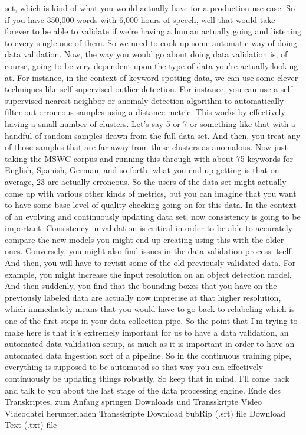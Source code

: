 {{{{    set, which is kind of what you would actually
    have for a production use case.
    So if you have 350,000 words with 6,000 hours of speech,
    well that would take forever to be able to validate
    if we're having a human actually going and listening
    to every single one of them.
    So we need to cook up some automatic way of doing data validation.
    Now, the way you would go about doing data validation
    is, of course, going to be very dependent upon the type of data
    you're actually looking at.
    For instance, in the context of keyword spotting data,
    we can use some clever techniques like self-supervised outlier detection.
    For instance, you can use a self-supervised nearest
    neighbor or anomaly detection algorithm to automatically filter out
    erroneous samples using a distance metric.
    This works by effectively having a small number of clusters.
    Let's say 5 or 7 or something like that with a handful of random samples drawn
    from the full data set.
    And then, you treat any of those samples that are far away from these clusters
    as anomalous.
    Now just taking the MSWC corpus and running this
    through with about 75 keywords for English, Spanish, German,
    and so forth, what you end up getting is that on average,
    23%
    are actually erroneous.
    So the users of the data set might actually
    come up with various other kinds of metrics,
    but you can imagine that you want to have some base level of quality
    checking going on for this data.
    In the context of an evolving and continuously updating data set,
    now consistency is going to be important.
    Consistency in validation is critical in order
    to be able to accurately compare the new models you might end up creating
    using this with the older ones.
    Conversely, you might also find issues in the data validation process itself.
    And then, you will have to revisit some of the old previously validated data.
    For example, you might increase the input resolution
    on an object detection model.
    And then suddenly, you find that the bounding boxes that you
    have on the previously labeled data are actually now imprecise
    at that higher resolution, which immediately
    means that you would have to go back to relabeling
    which is one of the first steps in your data collection pipe.
    So the point that I'm trying to make here
    is that it's extremely important for us to have a data validation, an automated
    data validation setup, as much as it is important
    in order to have an automated data ingestion sort of a pipeline.
    So in the continuous training pipe, everything
    is supposed to be automated so that way you can effectively continuously
    be updating things robustly.
    So keep that in mind.
    I'll come back and talk to you about the last stage of the data processing
    engine.
    Ende des Transkriptes, zum Anfang springen
    Downloads und Transskripte
    Video
    Videodatei herunterladen
    Transskripte
    Download SubRip (.srt) file
    Download Text (.txt) file        
 
}}}}
